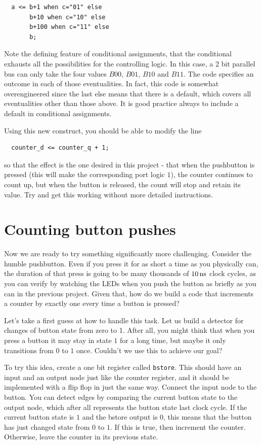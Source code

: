 \documentclass[../physical_computing.tex]{subfiles}
\begin{document}
\begin{verbatim}
  a <= b+1 when c="01" else
       b+10 when c="10" else
       b+100 when c="11" else
       b;
\end{verbatim}

Note the defining feature of conditional assignments, that the conditional exhausts all the possibilities for the controlling logic. In this case, a 2 bit parallel bus can only take the four values $B00$, $B01$, $B10$ and $B11$. The code specifies an outcome in each of those eventualities. In fact, this code is somewhat overengineered since the last else means that there is a default, which covers all eventualities other than those above. It is good practice always to include a default in conditional assignments.

Using this new construct, you should be able to modify the line
\begin{verbatim}
  counter_d <= counter_q + 1; 
\end{verbatim}
so that the effect is the one desired in this project - that when the pushbutton is pressed (this will make the corresponding port logic $1$), the counter continues to count up, but when the button is released, the count will stop and retain its value. Try and get this working without more detailed instructions.

\section{Counting button pushes}
\label{sec:pushbuttoncounter}

Now we are ready to try something significantly more challenging. Consider the humble pushbutton. Even if you press it for as short a time as you physically can, the duration of that press is going to be many thousands of $\rm 10\,ns$ clock cycles, as you can verify by watching the LEDs when you push the button as briefly as you can in the previous project. Given that, how do we build a code that increments a counter by exactly one every time a button is pressed?

Let's take a first guess at how to handle this task. Let us build a detector for changes of button state from zero to 1. After all, you might think that when you press a button it may stay in state $1$ for a long time, but maybe it only transitions from $0$ to $1$ once. Couldn't we use this to achieve our goal?

To try this idea, create a one bit register called \texttt{bstore}. This should have an input and an output node just like the counter register, and it should be implemented with a flip flop in just the same way. Connect the input node to the button. You can detect edges by comparing the current button state to the output node, which after all represents the button state last clock cycle. If the current button state is $1$ and the bstore output is $0$, this means that the button has just changed state from $0$ to $1$. If this is true, then increment the counter. Otherwise, leave the counter in its previous state.
\end{document}
